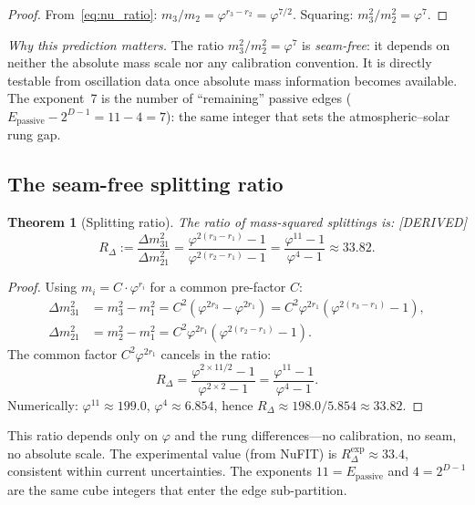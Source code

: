 \documentclass[11pt,a4paper]{article}
\newtheorem{theorem}{Theorem}[section]
\theoremstyle{definition}
\theoremstyle{remark}
\newcommand{\phig}{\varphi}
\newcommand{\Epass}{E_{\mathrm{passive}}}
\newcommand{\DERIVED}{\textcolor{blue!70!black}{\footnotesize\textsf{[DERIVED]}}}
\begin{document}
\begin{proof}
From~\eqref{eq:nu_ratio}:
$m_3/m_2 = \phig^{r_3 - r_2} = \phig^{7/2}$.
Squaring: $m_3^2/m_2^2 = \phig^7$.
\end{proof}

\noindent\textit{Why this prediction matters.}\quad
The ratio $m_3^2/m_2^2 = \phig^7$ is \emph{seam-free}: it depends on
neither the absolute mass scale nor any calibration convention.
It is directly testable from oscillation data once absolute mass information
becomes available.  The exponent~7 is the number of ``remaining'' passive
edges ($\Epass - 2^{D-1} = 11 - 4 = 7$): the same integer that sets the
atmospheric--solar rung gap.

\subsection{The seam-free splitting ratio}

\begin{theorem}[Splitting ratio]
\label{thm:splitting_ratio}
The ratio of mass-squared splittings is: \DERIVED{}
\begin{equation}
  \boxed{R_\Delta
    := \frac{\Delta m^2_{31}}{\Delta m^2_{21}}
    = \frac{\phig^{2(r_3 - r_1)} - 1}{\phig^{2(r_2 - r_1)} - 1}
    = \frac{\phig^{11} - 1}{\phig^4 - 1}
    \approx 33.82.}
  \label{eq:splitting_ratio}
\end{equation}
\end{theorem}

\begin{proof}
Using $m_i = C \cdot \phig^{r_i}$ for a common pre-factor $C$:
\begin{align*}
  \Delta m^2_{31}
    &= m_3^2 - m_1^2 = C^2(\phig^{2r_3} - \phig^{2r_1})
    = C^2 \phig^{2r_1}(\phig^{2(r_3-r_1)} - 1), \\
  \Delta m^2_{21}
    &= m_2^2 - m_1^2 = C^2 \phig^{2r_1}(\phig^{2(r_2-r_1)} - 1).
\end{align*}
The common factor $C^2 \phig^{2r_1}$ cancels in the ratio:
\[
  R_\Delta
    = \frac{\phig^{2 \times 11/2} - 1}{\phig^{2 \times 2} - 1}
    = \frac{\phig^{11} - 1}{\phig^4 - 1}.
\]
Numerically: $\phig^{11} \approx 199.0$, $\phig^4 \approx 6.854$, hence
$R_\Delta \approx 198.0 / 5.854 \approx 33.82$.
\end{proof}

\noindent
This ratio depends only on $\phig$ and the rung differences---no calibration,
no seam, no absolute scale.  The experimental value (from NuFIT) is
$R_\Delta^{\mathrm{exp}} \approx 33.4$, consistent within current
uncertainties.  The exponents $11 = \Epass$ and $4 = 2^{D-1}$ are the same
cube integers that enter the edge sub-partition.
\end{document}
